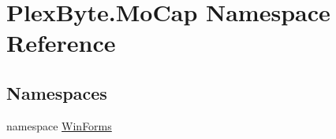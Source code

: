 \hypertarget{namespace_plex_byte_1_1_mo_cap}{}\section{Plex\+Byte.\+Mo\+Cap Namespace Reference}
\label{namespace_plex_byte_1_1_mo_cap}
\subsection*{Namespaces}
\begin{DoxyCompactItemize}
\item 
namespace \hyperlink{namespace_plex_byte_1_1_mo_cap_1_1_win_forms}{Win\+Forms}
\end{DoxyCompactItemize}
